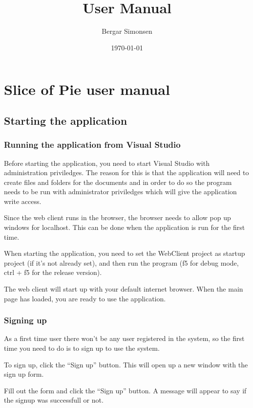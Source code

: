 \documentclass[11pt]{article}
\title{User Manual}
\author{Bergar Simonsen}
\date{\today}
\begin{document}
\maketitle

\setcounter{tocdepth}{3}
\tableofcontents
\vspace*{1cm}
\section{Slice of Pie user manual}
\label{sec-1}
\subsection{Starting the application}
\label{sec-1-1}
\subsubsection{Running the application from Visual Studio}
\label{sec-1-1-1}

    Before starting the application, you need to start Visual Studio with administration priviledges.
    The reason for this is that the application will need to create files and folders for the documents
    and in order to do so the program needs to be run with administrator priviledges which will give the 
    application write access.

    Since the web client runs in the browser, the browser needs to allow pop up windows for localhost.
    This can be done when the application is run for the first time.

    When starting the application, you need to set the WebClient project as startup project (if it's not
    already set), and then run the program (f5 for debug mode, ctrl + f5 for the release version).

    The web client will start up with your default internet browser. 
    When the main page has loaded, you are ready to use the application.
\subsubsection{Signing up}
\label{sec-1-1-2}

    As a first time user there won't be any user registered in the system, so the first time you need
    to do is to sign up to use the system.

    To sign up, click the ``Sign up'' button. This will open up a new window with the sign up form.

    Fill out the form and click the ``Sign up'' button. A message will appear to say if the signup
    was successfull or not.
\end{document}
